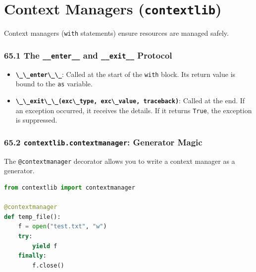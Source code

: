 \hypertarget{context-managers-contextlib}{%
\chapter{\texorpdfstring{Context Managers
(\texttt{contextlib})}{Context Managers (contextlib)}}\label{context-managers-contextlib}}

Context managers (\passthrough{\lstinline!with!} statements) ensure
resources are managed safely.

\hypertarget{the-__enter__-and-__exit__-protocol}{%
\subsection{\texorpdfstring{65.1 The \texttt{\_\_enter\_\_} and
\texttt{\_\_exit\_\_}
Protocol}{65.1 The \_\_enter\_\_ and \_\_exit\_\_ Protocol}}\label{the-__enter__-and-__exit__-protocol}}

\begin{itemize}
\tightlist
\item
  \textbf{\passthrough{\lstinline!\_\_enter\_\_!}}: Called at the start
  of the \passthrough{\lstinline!with!} block. Its return value is bound
  to the \passthrough{\lstinline!as!} variable.
\item
  \textbf{\passthrough{\lstinline!\_\_exit\_\_(exc\_type, exc\_value, traceback)!}}:
  Called at the end. If an exception occurred, it receives the details.
  If it returns \passthrough{\lstinline!True!}, the exception is
  suppressed.
\end{itemize}

\hypertarget{contextlib.contextmanager-generator-magic}{%
\subsection{\texorpdfstring{65.2 \texttt{contextlib.contextmanager}:
Generator
Magic}{65.2 contextlib.contextmanager: Generator Magic}}\label{contextlib.contextmanager-generator-magic}}

The \passthrough{\lstinline!@contextmanager!} decorator allows you to
write a context manager as a generator.

\begin{lstlisting}[language=Python]
from contextlib import contextmanager

@contextmanager
def temp_file():
    f = open("test.txt", "w")
    try:
        yield f
    finally:
        f.close()
\end{lstlisting}

